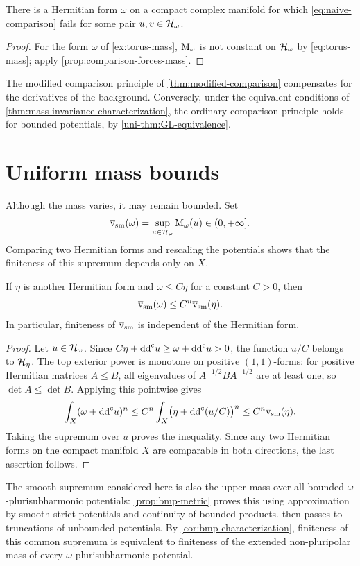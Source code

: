 \begin{corollary}\label{cor:comparison-fails}
There is a Hermitian form $\omega$ on a compact complex manifold for which \eqref{eq:naive-comparison} fails for some pair $u,v\in\mathcal H_\omega$.
\end{corollary}
\begin{proof}
For the form $\omega$ of \cref{ex:torus-mass}, $\mathrm M_\omega$ is not constant on $\mathcal H_\omega$ by \eqref{eq:torus-mass}; apply \cref{prop:comparison-forces-mass}.
\end{proof}

The modified comparison principle of \cref{thm:modified-comparison} compensates for the derivatives of the background. Conversely, under the equivalent conditions of \cref{thm:mass-invariance-characterization}, the ordinary comparison principle holds for bounded potentials, by \cref{uni-thm:GL-equivalence}.

\section{Uniform mass bounds}

Although the mass varies, it may remain bounded. Set
\[
 \overline{\mathrm v}_{\mathrm{sm}}(\omega)=\sup_{u\in\mathcal H_\omega}\mathrm M_\omega(u)\in(0,+\infty].
\]
Comparing two Hermitian forms and rescaling the potentials shows that the finiteness of this supremum depends only on $X$.

\begin{proposition}\label{prop:smooth-bmp-metric}
If $\eta$ is another Hermitian form and $\omega\leq C\eta$ for a constant $C>0$, then
\[
 \overline{\mathrm v}_{\mathrm{sm}}(\omega)\leq C^n\overline{\mathrm v}_{\mathrm{sm}}(\eta).
\]
In particular, finiteness of $\overline{\mathrm v}_{\mathrm{sm}}$ is independent of the Hermitian form.
\end{proposition}
\begin{proof}
Let $u\in\mathcal H_\omega$. Since $C\eta+\mathrm{dd}^{\mathrm{c}} u\geq\omega+\mathrm{dd}^{\mathrm{c}} u>0$, the function $u/C$ belongs to $\mathcal H_\eta$. The top exterior power is monotone on positive $(1,1)$-forms: for positive Hermitian matrices $A\leq B$, all eigenvalues of $A^{-1/2}BA^{-1/2}$ are at least one, so $\det A\leq\det B$. Applying this pointwise gives
\[
 \int_X(\omega+\mathrm{dd}^{\mathrm{c}} u)^n
 \leq C^n\int_X\bigl(\eta+\mathrm{dd}^{\mathrm{c}}(u/C)\bigr)^n
 \leq C^n\overline{\mathrm v}_{\mathrm{sm}}(\eta).
\]
Taking the supremum over $u$ proves the inequality. Since any two Hermitian forms on the compact manifold $X$ are comparable in both directions, the last assertion follows.
\end{proof}

The smooth supremum considered here is also the upper mass over all bounded $\omega$-plurisubharmonic potentials: \cref{prop:bmp-metric} proves this using approximation by smooth strict potentials and continuity of bounded products.  then passes to truncations of unbounded potentials. By \cref{cor:bmp-characterization}, finiteness of this common supremum is equivalent to finiteness of the extended non-pluripolar mass of every $\omega$-plurisubharmonic potential.
